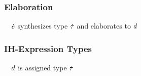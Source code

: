 \documentclass[12pt]{article}
\begin{document}
\subsubsection{Elaboration}
        {~~$\HExpVar$ synthesizes type $\HTypVar$ and elaborates to $\IHExpVar$}
%
\begin{mathpar}

\end{mathpar}

\subsubsection{IH-Expression Types}
        {~~$\IHExpVar$ is assigned type $\HTypVar$}
%
\begin{mathpar}

\end{mathpar}
\end{document}
